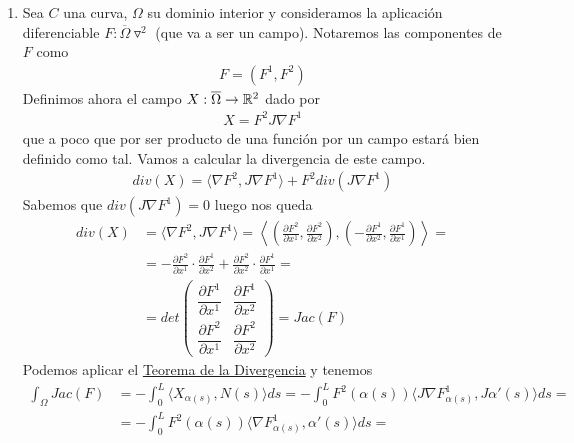 \begin{observacion}
\begin{enumerate}[start=4]
        \item Sea $C$ una curva, $\Omega$ su dominio interior y consideramos la aplicación diferenciable $F:\overline{\Omega} \triangledown^2$ (que va a ser un campo). Notaremos las componentes de $F$ como 
        \begin{gather*}
            F=(F^1, F^2)
        \end{gather*}
        Definimos ahora el campo $X:\overline{\Omega}\to \mathbb{R}^2$ dado por 
        \begin{gather*}
            X = F^2 J \nabla F^1
        \end{gather*}
        que a poco que por ser producto de una función por un campo estará bien definido como tal. Vamos a calcular la divergencia de este campo.
        \begin{gather*}
            div(X) = \langle \nabla F^2, J\nabla F^1 \rangle + F^2div(J\nabla F^1)
        \end{gather*}
        Sabemos que $div(J\nabla F^1)=0$ luego nos queda
        \begin{align*}
            div(X) &= 
            \langle \nabla F^2, J\nabla F^1 \rangle = 
            \left\langle \left(\frac{\partial F^2}{\partial x^1}, \frac{\partial F^2}{\partial x^2} \right) , \left(-\frac{\partial F^1}{\partial x^2}, \frac{\partial F^1}{\partial x^1} \right) \right\rangle =\\
            &=
            - \frac{\partial F^2}{\partial x^1} \cdot \frac{\partial F^1}{\partial x^2} + \frac{\partial F^2}{\partial x^2}\cdot \frac{\partial F^1}{\partial x^1} = \\
            &=
            det 
            \begin{pmatrix}
                \dfrac{\partial F^1}{\partial x^1} & \dfrac{\partial F^1}{\partial x^2}\\
                \dfrac{\partial F^2}{\partial x^1} & \dfrac{\partial F^2}{\partial x^2}
            \end{pmatrix} = Jac(F)
        \end{align*}
        Podemos aplicar el \hyperref[teo:divergencia]{Teorema de la Divergencia} y tenemos
        \begin{align*}
            \int_\Omega Jac(F) &=
            - \int_0^L \langle X_{\alpha(s)}, N(s) \rangle ds =
            - \int_0^L F^2(\alpha(s))\langle J\nabla F^1_{\alpha(s)} , J\alpha'(s)\rangle ds =\\
            &=
            - \int_0^L F^2(\alpha(s)) \langle\nabla F^1_{\alpha(s)}, \alpha'(s) \rangle ds =

\end{align*}
\end{enumerate}
\end{observacion}
